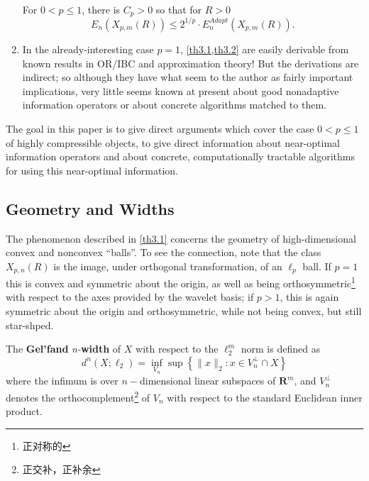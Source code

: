 \begin{enumerate}
\begin{theorem}
            For $0<p\leq 1$, there is $C_p > 0$ so that for $R > 0$
            \begin{equation*}
                E_n(X_{p,m}(R)) \leq 2^{1/p} \cdot E_n^{Adapt}(X_{p,m}(R)).
            \end{equation*}
            \label{th3.2}
        \end{theorem}
    \item In the already-interesting case $p=1$, \cref{th3.1,th3.2} are easily derivable from known results in OR/IBC and approximation theory! But the derivations are indirect; so although they have what seem to the author as fairly important implications, very little seems known at present about good nonadaptive information operators or about concrete algorithms matched to them. 
\end{enumerate}

The goal in this paper is to give direct arguments which cover the case $0<p \leq 1$ of highly compressible objects, to give direct information about near-optimal information operators and about concrete, computationally tractable algorithms for using this near-optimal information. 

\subsection{Geometry and Widths}
\label{n-widths}
The phenomenon described in \cref{th3.1} concerns the geometry of \textcolor[rgb]{1,0,0}{high-dimensional convex and nonconvex ``balls''}. To see the connection, note that the class $X_{p,n}(R)$ is the image, under orthogonal transformation, of an $\ell_p$ ball. If $p=1$ this is convex and symmetric about the origin, as well as being orthosymmetric\footnote{正对称的} with respect to the axes provided by the wavelet basis; if $p>1$, this is again symmetric about the origin and orthosymmetric, while \textcolor[rgb]{0,0,1}{not being convex, but still star-shped}.

\begin{definition}
    \label{def3.1.1}
    The \textbf{Gel'fand} \emph{n-}\textbf{width} of $X$ with respect to the $\ell_2^m$ norm is defined as 
    \begin{equation*}
        d^n(X;\ell_2) = \inf\limits_{V_n}\sup\left\{\|x\|_2: x \in V_n^{\bot} \cap X\right\}
    \end{equation*}
    where the infimum is over $n-$dimensional linear subspaces of $\mathbf{R}^m$, and $V_n^{\bot}$ denotes the orthocomplement\footnote{正交补，正补余} of $V_n$ with respect to the standard Euclidean inner product.
\end{definition}

